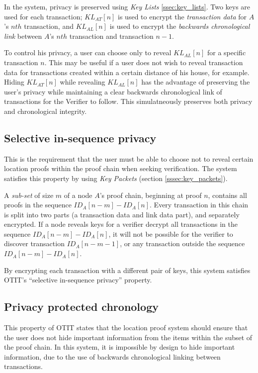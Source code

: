In the system, privacy is preserved using \textit{Key Lists} \ref{ssec:key_lists}. Two keys are used for each transaction; $KL_{AT}[n]$ is used to encrypt the \textit{transaction data} for $A$'s $nth$ transaction, and $KL_{AL}[n]$ is used to encrypt the \textit{backwards chronological link} between $A$'s $nth$ transaction and transaction $n-1$.

To control his privacy, a user can choose only to reveal $KL_{AL}[n]$ for a specific transaction $n$. This may be useful if a user does not wish to reveal transaction data for transactions created within a certain distance of his house, for example. Hiding $KL_{AT}[n]$ while revealing $KL_{AL}[n]$ has the advantage of preserving the user's privacy while maintaining a clear backwards chronological link of transactions for the Verifier to follow. This simulatneously preserves both privacy and chronological integrity.

\subsection{Selective in-sequence privacy}
This is the requirement that the user must be able to choose not to reveal certain location proofs within the proof chain when seeking verification. The system satisfies this property by using \textit{Key Packets} (section \ref{sssec:key_packets}).

A \textit{sub-set} of size $m$ of a node $A$'s proof chain, beginning at proof $n$, contains all proofs in the sequence $ID_{A}[n-m] - ID_{A}[n]$. Every transaction in this chain is split into two parts (a transaction data and link data part), and separately encrypted. If a node reveals keys for a verifier decrypt all transactions in the sequence $ID_{A}[n-m] - ID_{A}[n]$, it will not be possible for the verifier to discover transaction $ID_{A}[n-m-1]$, or any transaction outside the sequence $ID_{A}[n-m] - ID_{A}[n]$.

By encrypting each transaction with a different pair of keys, this system satisfies OTIT's ``selective in-sequence privacy'' property.

\subsection{Privacy protected chronology}
This property of OTIT states that the location proof system should ensure that the user does not hide important information from the items within the subset of the proof chain. In this system, it is impossible by design to hide important information, due to the use of backwards chronological linking between transactions. 

